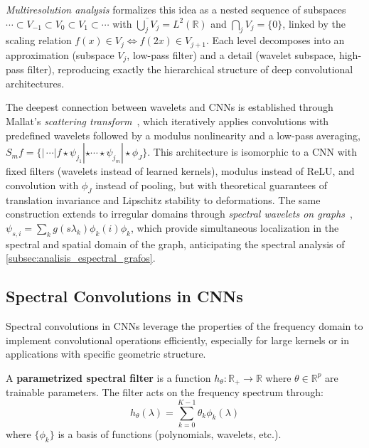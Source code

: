 \textit{Multiresolution analysis} formalizes this idea as a nested sequence of subspaces $\cdots \subset V_{-1} \subset V_0 \subset V_1 \subset \cdots$ with $\overline{\bigcup_j V_j} = L^2(\mathbb{R})$ and $\bigcap_j V_j = \{0\}$, linked by the scaling relation $f(x) \in V_j \Leftrightarrow f(2x) \in V_{j+1}$. Each level decomposes into an approximation (subspace $V_j$, low-pass filter) and a detail (wavelet subspace, high-pass filter), reproducing exactly the hierarchical structure of deep convolutional architectures.

\begin{remark}
The deepest connection between wavelets and CNNs is established through Mallat's \textit{scattering transform}~\citep{Mallat2012scattering}, which iteratively applies convolutions with predefined wavelets followed by a modulus nonlinearity and a low-pass averaging, $S_m f = \{|\,\cdots|f \star \psi_{j_1}| \star \cdots \star \psi_{j_m}| \star \phi_J\}$. This architecture is isomorphic to a CNN with fixed filters (wavelets instead of learned kernels), modulus instead of ReLU, and convolution with $\phi_J$ instead of pooling, but with theoretical guarantees of translation invariance and Lipschitz stability to deformations. The same construction extends to irregular domains through \textit{spectral wavelets on graphs}~\citep{hammond2011wavelets}, $\psi_{s,i} = \sum_k g(s\lambda_k)\phi_k(i)\phi_k$, which provide simultaneous localization in the spectral and spatial domain of the graph, anticipating the spectral analysis of \autoref{subsec:analisis_espectral_grafos}.
\end{remark}

\subsection{Spectral Convolutions in CNNs}\label{subsec:convoluciones_espectrales_cnns}

Spectral convolutions in CNNs leverage the properties of the frequency domain to implement convolutional operations efficiently, especially for large kernels or in applications with specific geometric structure.

\begin{definition}\label{def:filtro_espectral_parametrizado}
A \textbf{parametrized spectral filter} is a function $h_\theta: \mathbb{R}_+ \to \mathbb{R}$ where $\theta \in \mathbb{R}^p$ are trainable parameters. The filter acts on the frequency spectrum through:
\begin{equation}
h_\theta(\lambda) = \sum_{k=0}^{K-1} \theta_k \phi_k(\lambda)
\end{equation}
where $\{\phi_k\}$ is a basis of functions (polynomials, wavelets, etc.).
\end{definition}

